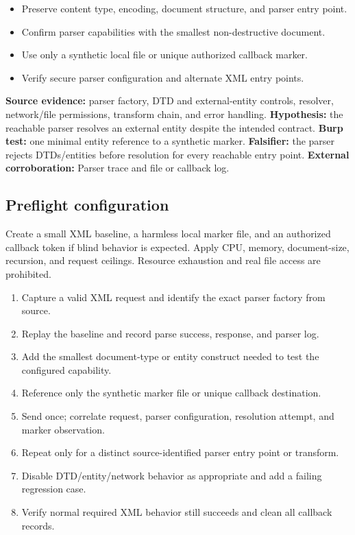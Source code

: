 \documentclass[11pt]{article}
\newcommand{\weekfield}[2]{%
  \Needspace{5\baselineskip}
  \subsection*{#1}
  #2
}
\newcommand{\externalproof}[1]{\textbf{External corroboration:} #1}
\begin{document}
\begin{objectivebox}
\begin{itemize}
  \item Preserve content type, encoding, document structure, and parser entry point.
  \item Confirm parser capabilities with the smallest non-destructive document.
  \item Use only a synthetic local file or unique authorized callback marker.
  \item Verify secure parser configuration and alternate XML entry points.
\end{itemize}
\end{objectivebox}

\begin{bridgebox}
\textbf{Source evidence:} parser factory, DTD and external-entity controls,
resolver, network/file permissions, transform chain, and error handling.
\textbf{Hypothesis:} the reachable parser resolves an external entity despite the
intended contract. \textbf{Burp test:} one minimal entity reference to a synthetic
marker. \textbf{Falsifier:} the parser rejects DTDs/entities before resolution
for every reachable entry point. \externalproof{Parser trace and file or callback
log.}
\end{bridgebox}

\weekfield{Preflight configuration}{Create a small XML baseline, a harmless local
marker file, and an authorized callback token if blind behavior is expected.
Apply CPU, memory, document-size, recursion, and request ceilings. Resource
exhaustion and real file access are prohibited.}

\begin{procedurebox}
\begin{enumerate}
  \item Capture a valid XML request and identify the exact parser factory from source.
  \item Replay the baseline and record parse success, response, and parser log.
  \item Add the smallest document-type or entity construct needed to test the configured capability.
  \item Reference only the synthetic marker file or unique callback destination.
  \item Send once; correlate request, parser configuration, resolution attempt, and marker observation.
  \item Repeat only for a distinct source-identified parser entry point or transform.
  \item Disable DTD/entity/network behavior as appropriate and add a failing regression case.
  \item Verify normal required XML behavior still succeeds and clean all callback records.
\end{enumerate}
\end{procedurebox}
\end{document}
